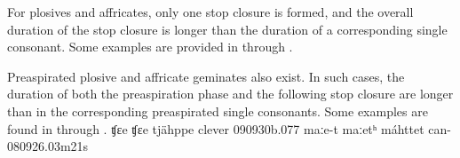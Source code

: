 For plosives and affricates, only one stop closure is formed, and the overall duration of the stop closure is longer than the duration of a corresponding single consonant. Some examples are provided in  through .

Preaspirated plosive and affricate geminates also exist. %
In such cases, the duration of both the preaspiration phase and the following stop closure are longer than in the corresponding preaspirated single consonants. Some examples are found in  through .
		{ʧɛe}		{ʧɛe}		{tjähppe}	{clever\BS{}}		{090930b}{.077}
				{maːe-t}	{maːetʰ}	{máhttet}	{can-}			{080926}{.03m21s}

